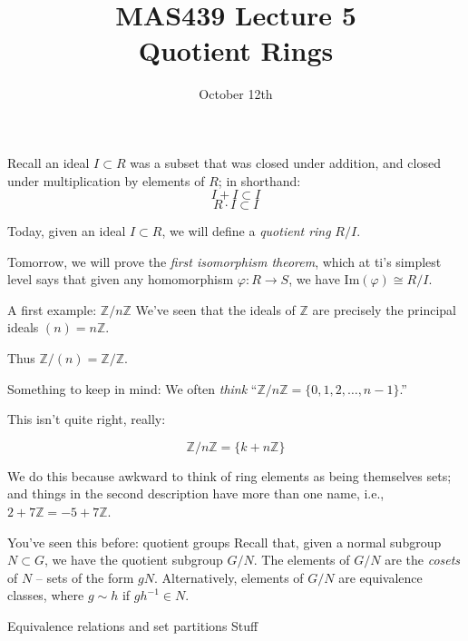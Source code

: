 \documentclass{beamer}
\title{MAS439 Lecture 5 \\ Quotient Rings}
\date{October 12th}
\begin{document}
\begin{frame}
\titlepage
\end{frame}


\begin{frame}{}

Recall an ideal $I\subset R$ was a subset that was closed under addition, and closed under multiplication by elements of $R$; in shorthand:
$$I+I\subset I$$
$$R\cdot I\subset I$$

Today, given an ideal $I\subset R$, we will define a \emph{quotient ring} $R/I$.

Tomorrow, we will prove the \emph{first isomorphism theorem}, which at ti's simplest level says that given any homomorphism $\varphi:R\to S$, we have $\textrm{Im}(\varphi)\cong R/I$.

\end{frame}

\begin{frame}{A first example: $\mathbb{Z}/n\mathbb{Z}$}
We've seen that the ideals of $\mathbb{Z}$ are precisely the principal ideals $(n)=n\mathbb{Z}$.

Thus $\mathbb{Z}/(n)=\mathbb{Z}/\mathbb{Z}$.

\begin{block}{Something to keep in mind:}
We often \emph{think} ``$\mathbb{Z}/n\mathbb{Z}=\{0,1,2,\dots, n-1\}$.''

This isn't quite right, really:

$$\mathbb{Z}/n\mathbb{Z}=\{k+n\mathbb{Z} \}$$

We do this because awkward to think of ring elements as being themselves sets; and things in the second description have more than one name, i.e., $2+7\mathbb{Z}=-5+7\mathbb{Z}$.

\end{block}


\end{frame}


\begin{frame}{You've seen this before: quotient groups}
Recall that, given a normal subgroup $N \subset  G$, we have the quotient subgroup $G/N$.  The elements of $G/N$ are the \emph{cosets} of $N$ -- sets of the form $gN$.  Alternatively, elements of $G/N$ are equivalence classes, where $g\sim h$ if $gh^{-1}\in N$.
\end{frame}




\begin{frame}{Equivalence relations and set partitions}
Stuff

\end{frame}
\end{document}
